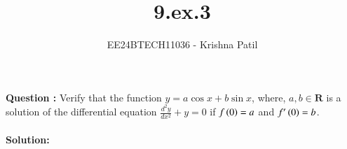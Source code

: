 \documentclass[journal]{IEEEtran}
\begin{document}

\vspace{3cm}

\title{9.ex.3}
\author{EE24BTECH11036 - Krishna Patil}
{\let\newpage\relax\maketitle}

\renewcommand{\thefigure}{\theenumi}
\renewcommand{\thetable}{\theenumi}
\setlength{\intextsep}{10pt} %

\textbf{Question :} Verify that the function $ y = a \cos{x} + b \sin{x} $, where, $ a, b \in \mathbf{R} $ is a solution of the differential equation 
$ \frac{d^2y}{dx^2} + y = 0 $ if $f\left(0\right)=a$ and $f^{\prime}\left(0\right)=b$.\\ \\

\textbf{Solution:}
\end{document}
